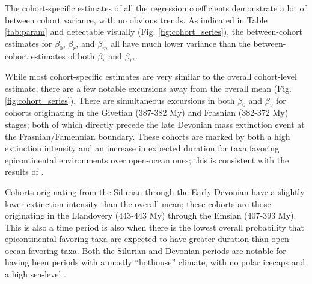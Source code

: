 \documentclass{article}
\begin{document}
The cohort-specific estimates of all the regression coefficients demonstrate a lot of between cohort variance, with no obvious trends. As indicated in Table \ref{tab:param} and detectable visually (Fig. \ref{fig:cohort_series}), the between-cohort estimates for \(\beta_{0}\), \(\beta_{r}\), and \(\beta_{m}\) all have much lower variance than the between-cohort estimates of both \(\beta_{v}\) and \(\beta_{v^{2}}\).

While most cohort-specific estimates are very similar to the overall cohort-level estimate, there are a few notable excursions away from the overall mean (Fig. \ref{fig:cohort_series}). There are simultaneous excursions in both \(\beta_{0}\) and \(\beta_{v}\) for cohorts originating in the Givetian (387-382 My) and Frasnian (382-372 My) stages; both of which directly precede the late Devonian mass extinction event at the Frasnian/Famennian boundary. These cohorts are marked by both a high extinction intensity and an increase in expected duration for taxa favoring epicontinental environments over open-ocean ones; this is consistent with the results of \citet{Miller2009a}.

Cohorts originating from the Silurian through the Early Devonian have a slightly lower extinction intensity than the overall mean; these cohorts are those originating in the Llandovery (443-443 My) through the Emsian (407-393 My). This is also a time period is also when there is the lowest overall probability that epicontinental favoring taxa are expected to have greater duration than open-ocean favoring taxa. Both the Silurian and Devonian periods are notable for having been periods with a mostly ``hothouse'' climate, with no polar icecaps and a high sea-level \citep{Edwards1985,Joachimski2009,Munnecke2010}.
\end{document}
